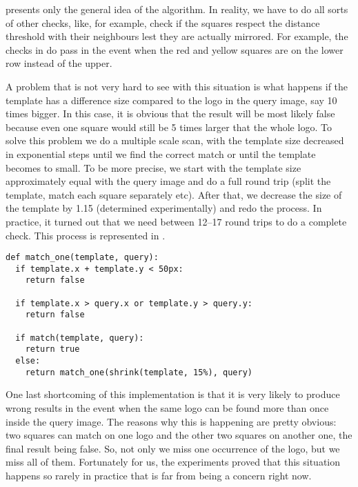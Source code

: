  presents only the general idea of the
algorithm. In reality, we have to do all sorts of other checks, like, for
example, check if the squares respect the distance threshold with their
neighbours lest they are actually mirrored. For example, the checks in
 do pass in the event when the red and
yellow squares are on the lower row instead of the upper.

A problem that is not very hard to see with this situation is what happens if
the template has a difference size compared to the logo in the query image,
say 10 times bigger. In this case, it is obvious that the result will be
most likely false because even one square would still be 5 times larger that
the whole logo. To solve this problem we do a multiple scale scan, with the
template size decreased in exponential steps until we find the correct match
or until the template becomes to small. To be more precise, we start with the
template size approximately equal with the query image and do a full round
trip (split the template, match each square separately etc). After that, we
decrease the size of the template by 1.15 (determined experimentally) and redo
the process. In practice, it turned out that we need between 12--17 round trips
to do a complete check. This process is represented in
.

\lstset{language=Python,caption=Multiple scale template
matching,label=lst:multiple-scale}
\begin{lstlisting}
def match_one(template, query):
  if template.x + template.y < 50px:
    return false

  if template.x > query.x or template.y > query.y:
    return false

  if match(template, query):
    return true
  else:
    return match_one(shrink(template, 15%), query)
\end{lstlisting}

One last shortcoming of this implementation is that it is very likely to
produce wrong results in the event when the same logo can be found more than
once inside the query image. The reasons why this is happening are pretty
obvious: two squares can match on one logo and the other two squares on
another one, the final result being false. So, not only we miss one occurrence
of the logo, but we miss all of them. Fortunately for us, the experiments
proved that this situation happens so rarely in practice that is far from
being a concern right now.
